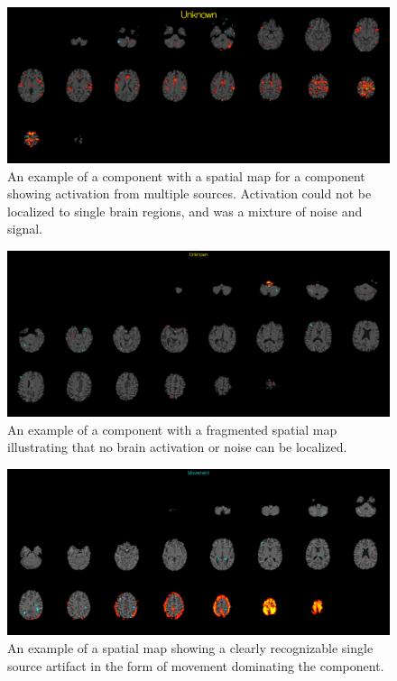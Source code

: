 \begin{figure}[H]                 
	\includegraphics[width=.85\textwidth]{figures/bMethods/Unknown_mix}  
	\caption{An example of a  component with a spatial map for a component showing activation from multiple sources. Activation could not be localized to single brain regions, and was a mixture of noise and signal.}
	\label{fig:meth:Unknown_mix} 
\end{figure}

\begin{figure}[H]                 
	\includegraphics[width=.85\textwidth]{figures/bMethods/Frag}  
	\caption{An example of a component with a fragmented spatial map illustrating that no brain activation or noise can be localized.}
	\label{fig:meth:Frag} 
\end{figure}

\begin{figure}[H]                 
	\includegraphics[width=.85\textwidth]{figures/bMethods/Movement}  
	\caption{An example of a spatial map showing a clearly recognizable single source artifact in the form of movement dominating the component.}
	\label{fig:meth:Move} 
\end{figure}






 